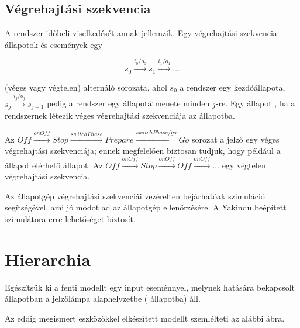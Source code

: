 \subsection{Végrehajtási szekvencia}

A rendszer időbeli viselkedését annak  jellemzik. Egy végrehajtási szekvencia állapotok és események egy

$$s_0 \xrightarrow{i_0 / o_0} s_1 \xrightarrow{i_1 / o_1} \ldots$$

(véges vagy végtelen) alternáló sorozata, ahol $s_0$ a rendszer egy kezdőállapota, $s_j \xrightarrow{i_j / o_j} s_{j+1}$ pedig a rendszer egy állapotátmenete minden $j$-re. Egy állapot , ha a rendszernek létezik véges végrehajtási szekvenciája az állapotba.

\begin{megjegyzes}
	Az $\mathit{Off} \xrightarrow{\mathit{onOff}} \mathit{Stop} \xrightarrow{\mathit{switchPhase}} \mathit{Prepare} \xrightarrow{\mathit{switchPhase} / \mathit{go}} \mathit{Go}$ sorozat a jelző egy véges végrehajtási szekvenciája; ennek megfelelően biztosan tudjuk, hogy például a  állapot elérhető állapot. Az $\mathit{Off} \xrightarrow{\mathit{onOff}} \mathit{Stop} \xrightarrow{\mathit{onOff}} \mathit{Off} \xrightarrow{\mathit{onOff}} \ldots$ egy végtelen végrehajtási szekvencia.
\end{megjegyzes}

Az állapotgép végrehajtási szekvenciái vezérelten bejárhatóak szimuláció segítségével, ami jó módot ad az állapotgép ellenőrzésére. A Yakindu beépített szimulátora erre lehetőséget biztosít.

\section{Hierarchia}

\begin{megjegyzes}
	Egészítsük ki a fenti modellt egy  input eseménnyel, melynek hatására bekapcsolt állapotban a jelzőlámpa alaphelyzetbe ( állapotba) áll.
	
	Az eddig megismert eszközökkel elkészített modellt szemlélteti az alábbi ábra.
\end{megjegyzes}


